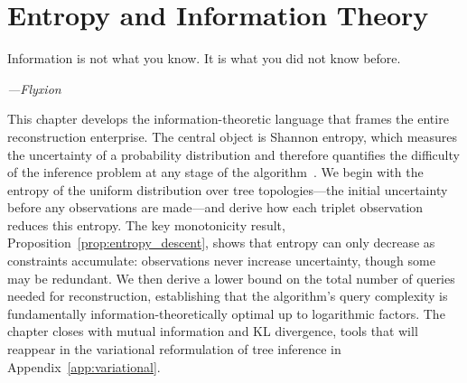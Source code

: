 \chapter{Entropy and Information Theory}
\label{ch:entropy}

\epigraph{%
  Information is not what you know. It is what you did not know before.%
}{\textit{---Flyxion}}

This chapter develops the information-theoretic language that frames the entire reconstruction enterprise. The central object is Shannon entropy, which measures the uncertainty of a probability distribution and therefore quantifies the difficulty of the inference problem at any stage of the algorithm~\cite{Cover2006}. We begin with the entropy of the uniform distribution over tree topologies---the initial uncertainty before any observations are made---and derive how each triplet observation reduces this entropy. The key monotonicity result, Proposition~\ref{prop:entropy_descent}, shows that entropy can only decrease as constraints accumulate: observations never increase uncertainty, though some may be redundant. We then derive a lower bound on the total number of queries needed for reconstruction, establishing that the algorithm's query complexity is fundamentally information-theoretically optimal up to logarithmic factors. The chapter closes with mutual information and KL divergence, tools that will reappear in the variational reformulation of tree inference in Appendix~\ref{app:variational}.

